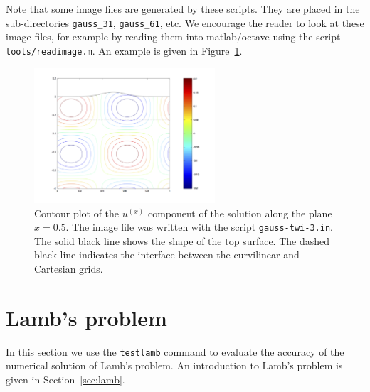 \documentclass[11pt]{report}
\begin{document}
Note that some image files are generated by these scripts. They are placed in the sub-directories
\verb+gauss_31+, \verb+gauss_61+, etc. We encourage the reader to look at these image files, for
example by reading them into matlab/octave using the script \verb+tools/readimage.m+. An example is
given in Figure~\ref{fig:ux}.
\begin{figure}
\begin{center}
\includegraphics[width=0.6\textwidth]{figures/ux.png}
\caption{Contour plot of the $u^{(x)}$ component of the solution along the plane $x=0.5$. The image
  file was written with the script {\tt gauss-twi-3.in}. The solid black line shows the shape of the
  top surface. The dashed black line indicates the interface between the curvilinear and Cartesian
  grids.}
\label{fig:ux}
\end{center}
\end{figure}


\section{Lamb's problem}\label{sec:testlamb}

In this section we use the {\tt testlamb} command to evaluate the accuracy of the numerical
solution of Lamb's problem. An introduction to Lamb's problem is given in Section~\ref{sec:lamb}.
\end{document}
